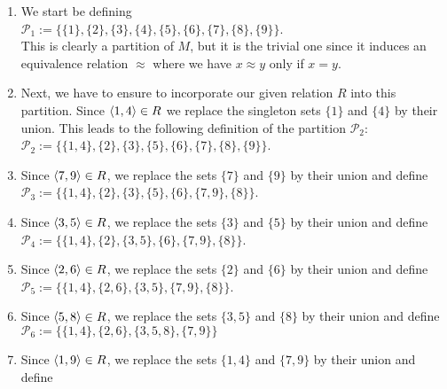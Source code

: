 \begin{enumerate}
\item We start be defining
      \\[0.2cm]
      \hspace*{1.3cm}
      $\mathcal{P}_1 := \bigl\{ \{1\}, \{2\}, \{3\}, \{4\}, \{5\}, \{6\}, \{7\}, \{8\}, \{9\} \bigr\}$.
      \\[0.2cm]
      This is clearly a partition of $M$, but it is the trivial one since it induces an equivalence
      relation $\approx$ where we have  $x \approx y$ only if $x = y$.  
\item Next, we have to ensure to incorporate our given relation $R$ into this partition.  Since $\pair(1,4) \in R$
      we replace the singleton sets $\{1\}$ and $\{4\}$ by their union.  This leads to the following
      definition of the partition $\mathcal{P}_2$:
      \\[0.2cm]
      \hspace*{1.3cm}
      $\mathcal{P}_2 := \bigl\{ \{1, 4\}, \{2\}, \{3\}, \{5\}, \{6\}, \{7\}, \{8\}, \{9\} \bigr\}$.
\item Since $\pair(7,9) \in R$, we replace the sets $\{7\}$ and $\{9\}$ by their union and define
      \\[0.2cm]
      \hspace*{1.3cm}
      $\mathcal{P}_3 := \bigl\{ \{1, 4\}, \{2\}, \{3\}, \{5\}, \{6\}, \{7, 9\}, \{8\} \bigr\}$.
\item Since $\pair(3,5) \in R$, we replace the sets $\{3\}$ and $\{5\}$ by their union and define
      \\[0.2cm]
      \hspace*{1.3cm}
      $\mathcal{P}_4 := \bigl\{ \{1, 4\}, \{2\}, \{3,5\}, \{6\}, \{7, 9\}, \{8\} \bigr\}$.
\item Since $\pair(2,6) \in R$, we replace the sets $\{2\}$ and $\{6\}$ by their union and define
      \\[0.2cm]
      \hspace*{1.3cm}
      $\mathcal{P}_5 := \bigl\{ \{1, 4\}, \{2,6\}, \{3,5\}, \{7, 9\}, \{8\} \bigr\}$.
\item Since $\pair(5,8) \in R$, we replace the sets $\{3,5\}$ and $\{8\}$ by their union and define
      \\[0.2cm]
      \hspace*{1.3cm}
      $\mathcal{P}_6 := \bigl\{ \{1, 4\}, \{2,6\}, \{3,5,8\}, \{7, 9\} \bigr\}$
\item Since $\pair(1,9) \in R$, we replace the sets $\{1,4\}$ and $\{7,9\}$ by their union and define

\end{enumerate}

